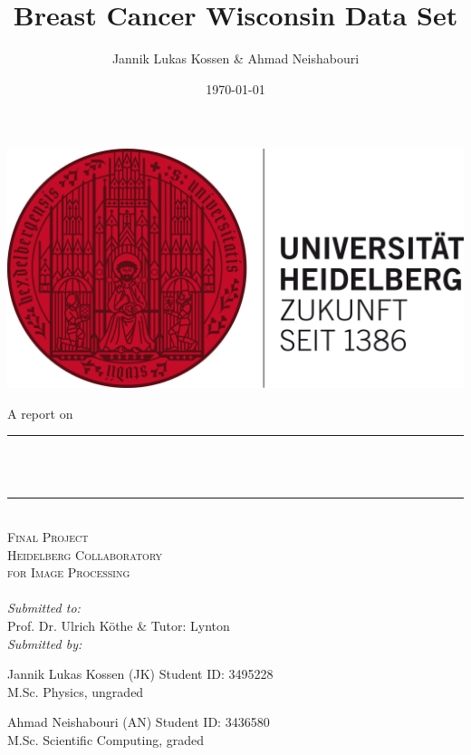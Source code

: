 \documentclass[12pt, a4paper]{scrartcl}
\title{Breast Cancer Wisconsin Data Set} %
\author{Jannik Lukas Kossen \& Ahmad Neishabouri}                               %
\date{\today}                                         %
\makeatletter
\let\thetitle\@title
\let\thedate\@date
\makeatother
\begin{document}

\begin{titlepage}
    \centering
    \includegraphics[scale = 0.6]{hdlogo}\\[2.0 cm]  %
     \begin{flushleft}
     \large  \hspace{1cm} A report on 
	\end{flushleft}      
     \centering
    \rule{\linewidth}{0.2 mm} \\[0.4 cm]
    { \huge \bfseries \thetitle}\\
    \rule{\linewidth}{0.2 mm} \\[1.5 cm]
    
    \textsc{\LARGE Final Project}\\[0.5 cm]               %
    \textsc{\Large Heidelberg Collaboratory \\[0.5em] for Image Processing}\\[2.0 cm]  %
    \thedate
   	\\[3em]
    \large
            \emph{Submitted to:}\\[1em]
            Prof. Dr. Ulrich Köthe \& Tutor: Lynton\\[1cm]
            \emph{Submitted by:} \\[1.5em]
            \begin{minipage}{0.4\textwidth}            
            	\begin{flushleft} 
					\large Jannik Lukas Kossen (JK) Student ID: 3495228 \\
					\small M.Sc. Physics, ungraded\\
      		  \end{flushleft}
      		 \end{minipage}
            \begin{minipage}{0.4\textwidth}            
            	\begin{flushright} 
    	    	    \large Ahmad Neishabouri (AN) Student ID: 3436580 \\ 
         	   		\small M.Sc. Scientific Computing, graded
      		  \end{flushright}
      		 \end{minipage}\\[2 cm]


        
 
\end{titlepage}
\end{document}
